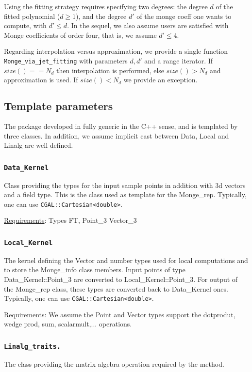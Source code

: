 Using the fitting strategy requires specifying two degrees: the degree
$d$ of the fitted polynomial ($d \geq 1$), and the degree $d'$ of the
monge coeff one wants to compute, with $d' \leq d $.  In the sequel,
we also assume users are satisfied with Monge coefficients of order
four, that is, we assume $d' \leq 4$.
\medskip

Regarding interpolation versus approximation, we provide a single
function {\tt Monge\_via\_jet\_fitting} with parameters $d,d'$ and a
range iterator. If $size()==N_d$ then interpolation is performed, else
$size() > N_d$ and approximation is used. If $size()< N_d$ we provide
an exception.

\subsection{Template parameters}

The package developed in fully generic in the C++ sense, and is
templated by three classes. In addition, we assume implicit cast
between Data, Local and Linalg are well defined.

\subsubsection{\tt Data\_Kernel} 
Class providing the types for the input sample points in addition with 
3d vectors and a field type. This is the class used as template for
the Monge\_rep. 
Typically, one can use {\tt CGAL::Cartesian<double>}.

\noindent \underline{Requirements}: Types FT, Point\_3 Vector\_3

\subsubsection{\tt Local\_Kernel}
The kernel defining the Vector and number types used for local
computations and to store the Monge\_info class members. Input points
of type Data\_Kernel::Point\_3 are converted to
Local\_Kernel::Point\_3. For output of the Monge\_rep class, these
types are converted back to Data\_Kernel ones.  Typically, one can use
{\tt CGAL::Cartesian<double>}.

\noindent \underline{Requirements}:  We assume the Point and Vector
types support the dotprodut, wedge prod, sum,
scalarmult,... operations.

\subsubsection{\tt Linalg\_traits.} 
The class providing the matrix algebra operation required by the
method.

